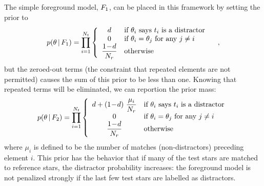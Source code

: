 The simple foreground model, $F_1$, can be placed in this framework
by setting the prior to
\begin{equation}
p(\theta \given \fgone) = \prod_{i=1}^{\ntest} \left\{
\begin{array}{cl}
  d                    & \text{if} \  \theta_i \ \text{says} \ t_i \ \text{is a distractor} \\
  0                    & \text{if} \  \theta_i = \theta_j \ \text{for any}\  j \ne i \\
  \displaystyle\frac{\oneminusd}{\nref} & \text{otherwise} \\
\end{array}
\right. \quad ,
\end{equation}
but the zeroed-out terms (the constraint that repeated elements are
not permitted) causes the sum of this prior to be less than one.
Knowing that repeated terms will be eliminated, we can reportion the
prior mass:
\begin{equation}
  p(\theta \given \fgtwo) = \prod_{i=1}^{\ntest} \left\{
\begin{array}{cl}
  d + (\oneminusd)\ \displaystyle\frac{\mu_i}{\nref} & \text{if} \  \theta_i \ \text{says} \ t_i \ \text{is a distractor} \\
  0                    & \text{if} \  \theta_i = \theta_j \ \text{for any}\  j \ne i \\
  \displaystyle\frac{\oneminusd}{\nref} & \text{otherwise} \\
\end{array} \right.
\end{equation}
where $\mu_i$ is defined to be the number of matches (non-distractors)
preceding element $i$.  This prior has the behavior that if many of
the test stars are matched to reference stars, the distractor
probability increases: the foreground model is not penalized strongly
if the last few test stars are labelled as distractors.




